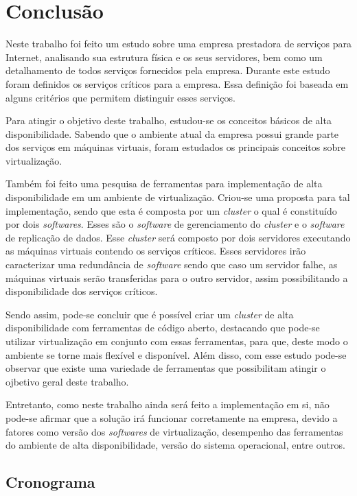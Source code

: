 \chapter{Conclusão}
\label{cap:conclusao}

Neste trabalho foi feito um estudo sobre uma empresa prestadora de serviços para Internet, analisando sua estrutura física e os seus servidores, 
bem como um detalhamento de todos serviços fornecidos pela empresa. Durante este estudo foram definidos os serviços críticos para a empresa.
Essa definição foi baseada em alguns critérios que permitem distinguir esses serviços.

Para atingir o objetivo deste trabalho, estudou-se os conceitos básicos de alta disponibilidade. Sabendo que o ambiente atual da empresa possui 
grande parte dos serviços em máquinas virtuais, foram estudados os principais conceitos sobre virtualização.

Também foi feito uma pesquisa de ferramentas para implementação de alta disponibilidade em um ambiente de virtualização. Criou-se uma proposta 
para tal implementação, sendo que esta é composta por um \textit{cluster} o qual é constituído por dois \textit{softwares}. Esses são o 
\textit{software} de gerenciamento do \textit{cluster} e o \textit{software} de replicação de dados. %
Esse \textit{cluster} será composto por dois servidores executando as máquinas virtuais contendo os serviços críticos. Esses servidores 
irão caracterizar uma redundância de \textit{software} sendo que caso um servidor falhe, as máquinas virtuais serão transferidas para o outro
servidor, assim possibilitando a disponibilidade dos serviços críticos.

Sendo assim, pode-se concluir que é possível criar um \textit{cluster} de alta disponibilidade com ferramentas de código aberto, destacando que 
pode-se utilizar virtualização em conjunto com essas ferramentas, para que, deste modo o ambiente se torne mais flexível e disponível. 
Além disso, com esse estudo pode-se observar que existe uma variedade de ferramentas que possibilitam atingir o ojbetivo geral deste trabalho.

Entretanto, como neste trabalho ainda será feito a implementação em si, não pode-se afirmar que a solução irá funcionar corretamente
na empresa, devido a fatores como versão dos \textit{softwares} de virtualização, desempenho das ferramentas do ambiente de alta disponibilidade, 
versão do sistema operacional, entre outros.

\newpage
\section{Cronograma}
\label{section:cronograma}

